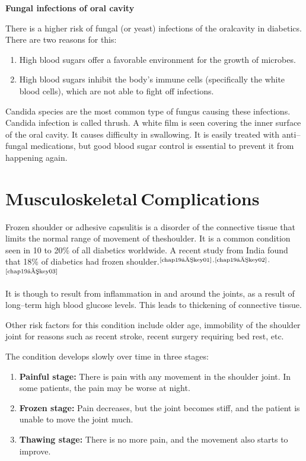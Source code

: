 \noindent\textbf{Fungal infections of oral cavity}

There is a higher risk of fungal (or yeast) infections of the oral\break cavity in diabetics. There are two reasons for this:

\begin{enumerate}[•]
\itemsep=0pt
\item High blood sugars offer a favorable environment for the growth of microbes.
\item High blood sugars inhibit the body’s immune cells (specifically the white blood cells), which are not able to fight off infections.
\end{enumerate}

Candida species are the most common type of fungus causing these infections. Candida infection is called thrush. A white film is seen covering the inner surface of the oral cavity. It causes difficulty in swallowing. It is easily treated with anti–fungal medications, but good blood sugar control is essential to prevent it from happening again.

\newpage

\renewcommand{\thechapter}{\arabic{chapter}}
\chapter{Musculoskeletal Complications}\label{chap19}


\vskip 6pt
Frozen shoulder or adhesive capsulitis is a disorder of the conne\-ctive tissue that limits the normal range of movement of the\break shoulder. It is a common condition seen in 10 to 20\% of all diabetics worldwide. A recent study from India found that 18\% of diabetics had frozen shoulder.$^{\text{\cite{chap19–key01}}}$$^,$$^{\text{\cite{chap19–key02}}}$$^,$$^{\text{\cite{chap19–key03}}}$


It is though to result from inflammation in and around the joints, as a result of long–term high blood glucose levels. This leads to thicke\-ning of connective tissue.


Other risk factors for this condition include older age, immobility of the shoulder joint for reasons such as recent stroke, recent surgery requiring bed rest, etc.

\vskip 5pt
\noindent The condition develops slowly over time in three stages:

\begin{enumerate}
\itemsep=0pt
\item \textbf{Painful stage:} There is pain with any movement in the shoulder joint. In some patients, the pain may be worse at night.
\item \textbf{Frozen stage:} Pain decreases, but the joint becomes stiff, and the patient is unable to move the joint much.
\item \textbf{Thawing stage:} There is no more pain, and the movement also starts to improve.
\end{enumerate}


